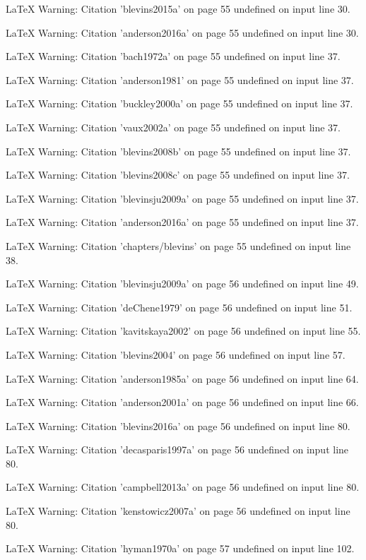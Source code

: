 LaTeX Warning: Citation 'blevins2015a' on page 55 undefined on input line 30.


LaTeX Warning: Citation 'anderson2016a' on page 55 undefined on input line 30.


LaTeX Warning: Citation 'bach1972a' on page 55 undefined on input line 37.


LaTeX Warning: Citation 'anderson1981' on page 55 undefined on input line 37.


LaTeX Warning: Citation 'buckley2000a' on page 55 undefined on input line 37.


LaTeX Warning: Citation 'vaux2002a' on page 55 undefined on input line 37.


LaTeX Warning: Citation 'blevins2008b' on page 55 undefined on input line 37.


LaTeX Warning: Citation 'blevins2008c' on page 55 undefined on input line 37.


LaTeX Warning: Citation 'blevinsju2009a' on page 55 undefined on input line 37.


LaTeX Warning: Citation 'anderson2016a' on page 55 undefined on input line 37.


LaTeX Warning: Citation 'chapters/blevins' on page 55 undefined on input line 38.


LaTeX Warning: Citation 'blevinsju2009a' on page 56 undefined on input line 49.


LaTeX Warning: Citation 'deChene1979' on page 56 undefined on input line 51.


LaTeX Warning: Citation 'kavitskaya2002' on page 56 undefined on input line 55.


LaTeX Warning: Citation 'blevins2004' on page 56 undefined on input line 57.


LaTeX Warning: Citation 'anderson1985a' on page 56 undefined on input line 64.


LaTeX Warning: Citation 'anderson2001a' on page 56 undefined on input line 66.


LaTeX Warning: Citation 'blevins2016a' on page 56 undefined on input line 80.


LaTeX Warning: Citation 'decasparis1997a' on page 56 undefined on input line 80.


LaTeX Warning: Citation 'campbell2013a' on page 56 undefined on input line 80.


LaTeX Warning: Citation 'kenstowicz2007a' on page 56 undefined on input line 80.


LaTeX Warning: Citation 'hyman1970a' on page 57 undefined on input line 102.


